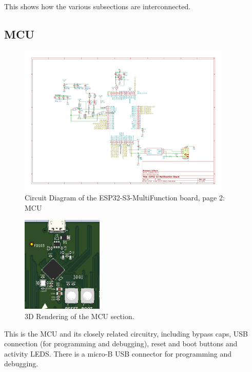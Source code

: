 This shows how the various subsections are interconnected.
\clearpage
\subsection{MCU}
\begin{figure}[hbpt]\begin{centering}%
\includegraphics[width=4in]{ESP32-S3-MultiFunction-2.pdf}
\caption{Circuit Diagram of the ESP32-S3-MultiFunction board, page 2: MCU}
\end{centering}\end{figure}
\begin{figure}[hbpt]\begin{centering}%
\includegraphics{ESP32-S3-MultiFunction-top3D-MCU.png}
\caption{3D Rendering of the MCU section.}
\end{centering}\end{figure}

This is the MCU and its closely related circuitry, including bypass caps, USB 
connection (for programming and debugging), reset and boot buttons and 
activity LEDS.  There is a micro-B USB connector for programming and 
debugging. 

